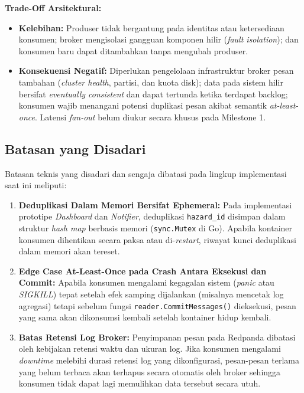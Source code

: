\clearpage
\noindent\textbf{Trade-Off Arsitektural:}
\begin{itemize}
    \item \textbf{Kelebihan:} Produser tidak bergantung pada identitas atau ketersediaan konsumen; broker mengisolasi gangguan komponen hilir (\textit{fault isolation}); dan konsumen baru dapat ditambahkan tanpa mengubah produser.
    \item \textbf{Konsekuensi Negatif:} Diperlukan pengelolaan infrastruktur broker pesan tambahan (\textit{cluster health}, partisi, dan kuota disk); data pada sistem hilir bersifat \textit{eventually consistent} dan dapat tertunda ketika terdapat backlog; konsumen wajib menangani potensi duplikasi pesan akibat semantik \textit{at-least-once}. Latensi \textit{fan-out} belum diukur secara khusus pada Milestone 1.
\end{itemize}

\subsection{Batasan yang Disadari}
\label{subsec:p5_batasan}
Batasan teknis yang disadari dan sengaja dibatasi pada lingkup implementasi saat ini meliputi:
\begin{enumerate}
    \item \textbf{Deduplikasi Dalam Memori Bersifat Ephemeral:}
    Pada implementasi prototipe \textit{Dashboard} dan \textit{Notifier}, deduplikasi \texttt{hazard\_id} disimpan dalam struktur \textit{hash map} berbasis memori (\texttt{sync.Mutex} di Go). Apabila kontainer konsumen dihentikan secara paksa atau di-\textit{restart}, riwayat kunci deduplikasi dalam memori akan tereset.
    \item \textbf{Edge Case At-Least-Once pada Crash Antara Eksekusi dan Commit:}
    Apabila konsumen mengalami kegagalan sistem (\textit{panic} atau \textit{SIGKILL}) tepat setelah efek samping dijalankan (misalnya mencetak log agregasi) tetapi sebelum fungsi \texttt{reader.CommitMessages()} dieksekusi, pesan yang sama akan dikonsumsi kembali setelah kontainer hidup kembali.
    \item \textbf{Batas Retensi Log Broker:}
    Penyimpanan pesan pada Redpanda dibatasi oleh kebijakan retensi waktu dan ukuran log. Jika konsumen mengalami \textit{downtime} melebihi durasi retensi log yang dikonfigurasi, pesan-pesan terlama yang belum terbaca akan terhapus secara otomatis oleh broker sehingga konsumen tidak dapat lagi memulihkan data tersebut secara utuh.
\end{enumerate}

